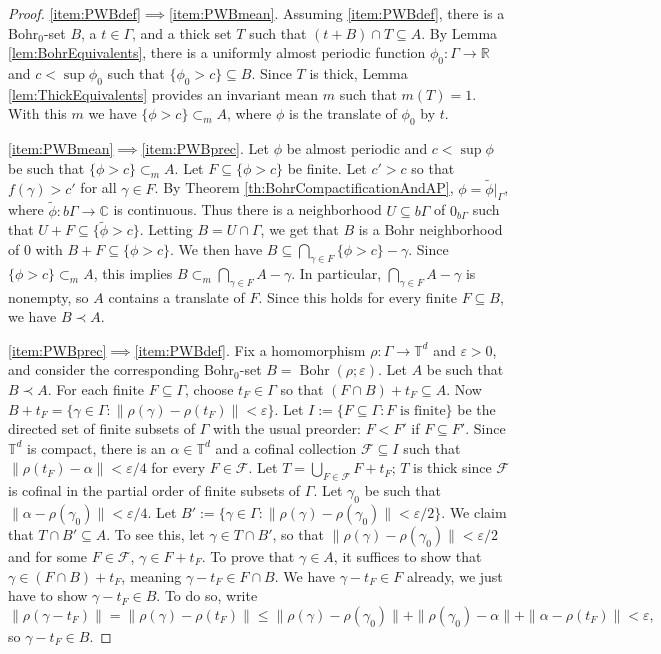 \documentclass[12pt]{amsart} \usepackage{amsmath,centernot,amssymb,leftindex}
\newcommand{\Bohr}{\operatorname{Bohr}}
\numberwithin{theorem}{section}
\numberwithin{equation}{section}
\theoremstyle{definition}
\begin{document}
	\begin{proof}
		\ref{item:PWBdef}$\implies$\ref{item:PWBmean}.  Assuming \ref{item:PWBdef}, there is a Bohr$_0$-set $B$, a $t\in \Gamma$, and a thick set $T$ such that $(t+B)\cap T\subseteq A$.  By Lemma \ref{lem:BohrEquivalents}, there is a uniformly almost periodic function $\phi_0:\Gamma\to \mathbb R$ and $c<\sup \phi_0$ such that $\{\phi_0>c\}\subseteq B$.  Since $T$ is thick, Lemma \ref{lem:ThickEquivalents} provides an invariant mean $m$ such that $m(T)=1$.  With this $m$ we have $\{\phi>c\}\subset_m A$, where $\phi$ is the translate of $\phi_0$ by $t$. 
		
		
		
		\ref{item:PWBmean}$\implies$\ref{item:PWBprec}.  Let $\phi$ be almost periodic and $c<\sup \phi$ be such that $\{\phi>c\}\subset_m A$. Let $F\subseteq \{\phi>c\}$ be finite.  Let $c'>c$ so that $f(\gamma)>c'$ for all $\gamma\in F$.  By Theorem \ref{th:BohrCompactificationAndAP}, $\phi=\tilde{\phi}|_{\Gamma}$, where $\tilde{\phi}:b\Gamma\to \mathbb C$ is continuous.  Thus there is a neighborhood $U\subseteq b\Gamma$ of $0_{b\Gamma}$ such that $U+F\subseteq \{\tilde{\phi}>c\}$.  Letting $B=U\cap \Gamma$, we get that $B$ is a Bohr neighborhood of $0$ with $B+F\subseteq \{\phi>c\}$.  We then have $B\subseteq \bigcap_{\gamma\in F} \{\phi>c\}-\gamma$.  Since $\{\phi>c\}\subset_m A$, this implies $B\subset_m \bigcap_{\gamma \in F} A-\gamma$.  In particular, $\bigcap_{\gamma \in F} A-\gamma$ is nonempty, so $A$ contains a translate of $F$.  Since this holds for every finite $F\subseteq B$, we have $B\prec A$.  
		
		
		\ref{item:PWBprec}$\implies$\ref{item:PWBdef}.  Fix a homomorphism $\rho:\Gamma\to \mathbb T^d$ and $\varepsilon>0$, and consider the corresponding Bohr$_0$-set $B=\Bohr(\rho;\varepsilon)$. Let $A$ be such that $B\prec A$.  For each finite $F\subseteq \Gamma$, choose $t_F\in \Gamma$ so that $(F\cap B)+t_F\subseteq A$.  Now $B+t_F=\{\gamma\in \Gamma: \|\rho(\gamma)-\rho(t_F)\|<\varepsilon\}$.  Let $I:=\{F\subseteq \Gamma: F \text{ is finite}\}$ be the directed set of finite subsets of $\Gamma$ with the usual preorder: $F<F'$ if $F\subseteq F'$.  Since $\mathbb T^d$ is compact, there is an $\alpha\in \mathbb T^d$ and a cofinal collection $\mathcal F\subseteq I$ such that $\|\rho(t_F)-\alpha\|<\varepsilon/4$ for every $F\in\mathcal F$.  Let $T=\bigcup_{F\in \mathcal F}F+t_F$;  $T$ is thick since $\mathcal F$ is cofinal in the partial order of finite subsets of $\Gamma$.
		Let $\gamma_0$ be such that $\|\alpha-\rho(\gamma_0)\|<\varepsilon/4$.  Let $B':=\{\gamma\in \Gamma:\|\rho(\gamma)-\rho(\gamma_0)\|<\varepsilon/2\}$.  We claim that $T\cap B'\subseteq A$.  To see this, let $\gamma\in T\cap B'$, so that $\|\rho(\gamma)-\rho(\gamma_0)\|<\varepsilon/2$ and for some $F\in \mathcal F$, $\gamma\in F+t_F$. 
		To prove that $\gamma\in A$, it suffices to show that $\gamma\in (F\cap B)+t_F$, meaning $\gamma-t_F\in F\cap B$.  We have $\gamma-t_F\in F$ already, we just have to show $\gamma-t_F\in B$.  To do so, write
		\[
		\|\rho(\gamma-t_F)\|=\|\rho(\gamma)-\rho(t_F)\|\leq \|\rho(\gamma)-\rho(\gamma_0)\|+\|\rho(\gamma_0)-\alpha\|+\|\alpha- \rho(t_F)\|<\varepsilon,
		\]
		so $\gamma-t_F\in B$.  \end{proof}
\end{document}
